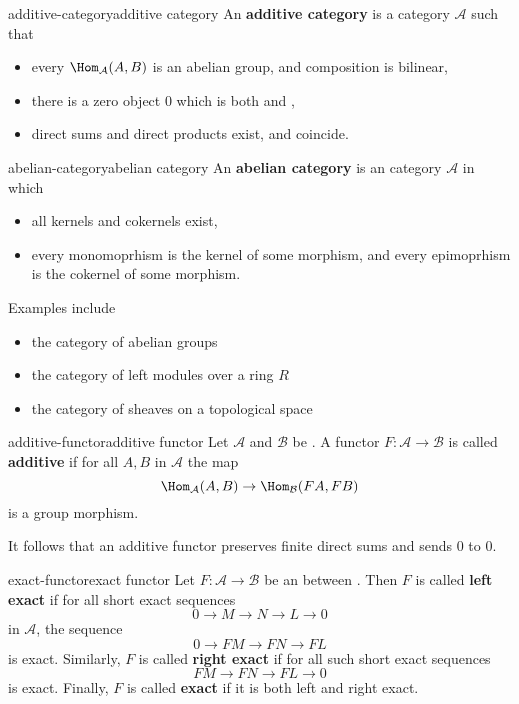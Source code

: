 \begin{topic}{additive-category}{additive category}
    An \textbf{additive category} is a category $\mathcal{A}$ such that
    \begin{itemize}
        \item every $\Hom_\mathcal{A}(A, B)$ is an abelian group, and composition is bilinear,
        \item there is a zero object $0$ which is both  and ,
        \item direct sums and direct products exist, and coincide.
    \end{itemize}
\end{topic}

\begin{topic}{abelian-category}{abelian category}
    An \textbf{abelian category} is an  category $\mathcal{A}$ in which
    \begin{itemize}
        \item all kernels and cokernels exist,
        \item every monomoprhism is the kernel of some morphism, and every epimoprhism is the cokernel of some morphism.
    \end{itemize}
    
    Examples include
    \begin{itemize}
        \item the category of abelian groups
        \item the category of left modules over a ring $R$
        \item the category of sheaves on a topological space
    \end{itemize}
\end{topic}

\begin{topic}{additive-functor}{additive functor}
    Let $\mathcal{A}$ and $\mathcal{B}$ be . A functor $F : \mathcal{A} \to \mathcal{B}$ is called \textbf{additive} if for all $A, B$ in $\mathcal{A}$ the map
    \[ \Hom_\mathcal{A}(A, B) \to \Hom_\mathcal{B}(FA, FB) \]
    is a group morphism.
    
    It follows that an additive functor preserves finite direct sums and sends $0$ to $0$.
\end{topic}

\begin{topic}{exact-functor}{exact functor}
    Let $F : \mathcal{A} \to \mathcal{B}$ be an  between . Then $F$ is called \textbf{left exact} if for all short exact sequences
    \[ 0 \to M \to N \to L \to 0 \]
     in $\mathcal{A}$, the sequence
    \[ 0 \to FM \to FN \to FL \]
    is exact. Similarly, $F$ is called \textbf{right exact} if for all such short exact sequences
    \[ FM \to FN \to FL \to 0 \]
    is exact. Finally, $F$ is called \textbf{exact} if it is both left and right exact.
\end{topic}

